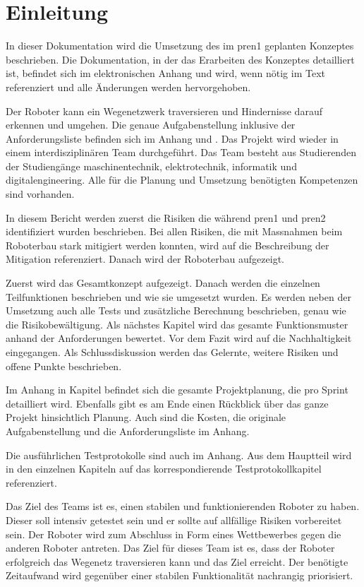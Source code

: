 \section{Einleitung}

In dieser Dokumentation wird die Umsetzung des im \acrfull{pren1} geplanten Konzeptes beschrieben. 
Die Dokumentation, in der das Erarbeiten des Konzeptes detailliert ist, befindet sich im elektronischen Anhang und wird, wenn nötig im Text referenziert und alle Änderungen werden hervorgehoben.

Der Roboter kann ein Wegenetzwerk traversieren und Hindernisse darauf erkennen und umgehen. Die genaue Aufgabenstellung inklusive der Anforderungsliste befinden sich im Anhang  und . Das Projekt wird wieder in einem interdisziplinären Team durchgeführt. Das Team besteht aus Studierenden der Studiengänge \acrfull{maschinentechnik}, \acrfull{elektrotechnik}, \acrfull{informatik} und \acrfull{digitalengineering}. Alle für die Planung und Umsetzung benötigten Kompetenzen sind vorhanden.


In diesem Bericht werden zuerst die Risiken die während \acrshort{pren1} und \acrshort{pren2} identifiziert wurden beschrieben. Bei allen Risiken, die mit Massnahmen beim Roboterbau stark mitigiert werden konnten, wird auf die Beschreibung der Mitigation referenziert. Danach wird der Roboterbau aufgezeigt.

Zuerst wird das Gesamtkonzept aufgezeigt. Danach werden die einzelnen Teilfunktionen beschrieben und wie sie umgesetzt wurden. Es werden neben der Umsetzung auch alle Tests und zusätzliche Berechnung beschrieben, genau wie die Risikobewältigung. 
Als nächstes Kapitel wird das gesamte Funktionsmuster anhand der Anforderungen bewertet. Vor dem Fazit wird auf die Nachhaltigkeit eingegangen. Als Schlussdiskussion werden das Gelernte, weitere Risiken und offene Punkte beschrieben.

Im Anhang in Kapitel  befindet sich die gesamte Projektplanung, die pro Sprint detailliert wird. Ebenfalls gibt es am Ende einen Rückblick über das ganze Projekt hinsichtlich Planung. Auch sind die Kosten, die originale Aufgabenstellung und die Anforderungsliste im Anhang.

Die ausführlichen Testprotokolle sind auch im Anhang. Aus dem Hauptteil wird in den einzelnen Kapiteln auf das korrespondierende Testprotokollkapitel referenziert.


Das Ziel des Teams ist es, einen stabilen und funktionierenden Roboter zu haben. Dieser soll intensiv getestet sein und er sollte auf allfällige Risiken vorbereitet sein. Der Roboter wird zum Abschluss in Form eines Wettbewerbes gegen die anderen Roboter antreten. Das Ziel für dieses Team ist es, dass der Roboter erfolgreich das Wegenetz traversieren kann und das Ziel erreicht. Der benötigte Zeitaufwand wird gegenüber einer stabilen Funktionalität nachrangig priorisiert.
